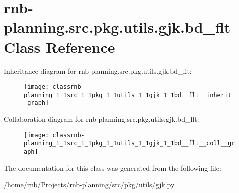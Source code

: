 \hypertarget{classrnb-planning_1_1src_1_1pkg_1_1utils_1_1gjk_1_1bd__flt}{}\section{rnb-\/planning.src.\+pkg.\+utils.\+gjk.\+bd\+\_\+flt Class Reference}
\label{classrnb-planning_1_1src_1_1pkg_1_1utils_1_1gjk_1_1bd__flt}


Inheritance diagram for rnb-\/planning.src.\+pkg.\+utils.\+gjk.\+bd\+\_\+flt\+:\nopagebreak
\begin{figure}[H]
\begin{center}
\leavevmode
\texttt{[image: classrnb-planning\_1\_1src\_1\_1pkg\_1\_1utils\_1\_1gjk\_1\_1bd\_\_flt\_\_inherit\_\_graph]}
\end{center}
\end{figure}


Collaboration diagram for rnb-\/planning.src.\+pkg.\+utils.\+gjk.\+bd\+\_\+flt\+:\nopagebreak
\begin{figure}[H]
\begin{center}
\leavevmode
\texttt{[image: classrnb-planning\_1\_1src\_1\_1pkg\_1\_1utils\_1\_1gjk\_1\_1bd\_\_flt\_\_coll\_\_graph]}
\end{center}
\end{figure}


The documentation for this class was generated from the following file\+:\begin{DoxyCompactItemize}
\item 
/home/rnb/\+Projects/rnb-\/planning/src/pkg/utils/gjk.\+py\end{DoxyCompactItemize}
